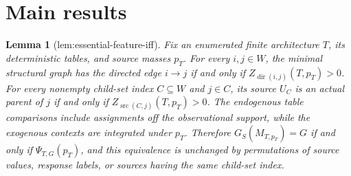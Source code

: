\documentclass{article}
\newtheorem{lemma}{Lemma}
\begin{document}
\section{Main results}

\begin{lemma}[lem:essential-feature-iff]\label{lem:essential-feature-iff}
Fix an enumerated finite architecture \(T\), its deterministic tables, and source masses \(p_T\). For every \(i,j\in W\), the minimal structural graph has the directed edge \(i\to j\) if and only if \(Z_{\operatorname{dir}(i,j)}(T,p_T)>0\). For every nonempty child-set index \(C\subseteq W\) and \(j\in C\), its source \(U_C\) is an actual parent of \(j\) if and only if \(Z_{\operatorname{src}(C,j)}(T,p_T)>0\). The endogenous table comparisons include assignments off the observational support, while the exogenous contexts are integrated under \(p_T\). Therefore \(G_S(M_{T,p_T})=G\) if and only if \(\Psi_{T,G}(p_T)\), and this equivalence is unchanged by permutations of source values, response labels, or sources having the same child-set index.
\end{lemma}
\end{document}
